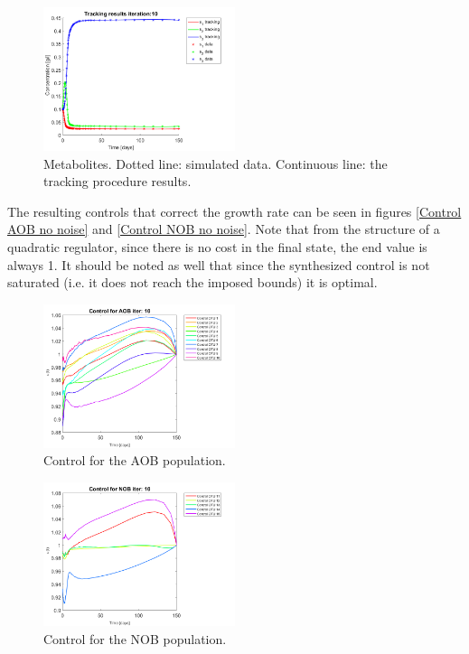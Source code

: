 \documentclass[3p,times]{elsarticle}
\begin{document}
\begin{figure}[h]
	\centering
	\includegraphics[width=0.5\textwidth]{Synthetic_data//lambda_=_e-4//191209_no_noise_metabolites_Iter_10}
	\caption{Metabolites. Dotted line: simulated data. Continuous line: the tracking procedure results.}
	\label{Metabolites no noise}
\end{figure}
\clearpage

The resulting controls that correct the growth rate can be seen in figures \eqref{Control AOB no noise} and \eqref{Control NOB no noise}. Note that from the structure of a quadratic regulator, since there is no cost in the final state, the end value is always 1. It should be noted as well that since the synthesized control is not saturated (i.e. it does not reach the imposed bounds) it is optimal.


\begin{figure}[h]
	\centering
	\includegraphics[width=0.5\textwidth]{Synthetic_data//lambda_=_e-4//191209_no_noise_Control_AOB_Iter_10}
	\caption{Control for the AOB population.}
	\label{Control AOB no noise}
\end{figure}

\begin{figure}[h]
	\centering
	\includegraphics[width=0.5\textwidth]{Synthetic_data//lambda_=_e-4//191209_no_noise_Control_NOB_Iter_10}
	\caption{Control for the NOB population.}
	\label{Control NOB no noise}
\end{figure}
\end{document}
